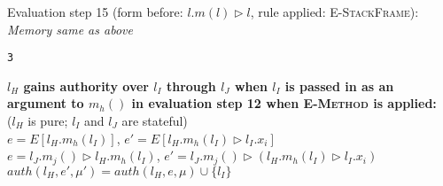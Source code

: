 \documentclass{llncs}
\begin{document}
\vspace{12pt}
\noindent Evaluation step 15 (form before: $l.m(l) \rhd l$, rule applied: \textsc{E-StackFrame}):\\
\vspace{-6pt}
\indent\textit{Memory same as above}\\
\vspace{-6pt}
\begin{lstlisting}[xleftmargin=20pt]
3
\end{lstlisting}


\newpage

\noindent\textbf{$l_H$ gains authority over $l_I$ through $l_J$ when $l_I$ is passed in as an argument to $m_h()$ in evaluation step 12 when \textsc{E-Method} is applied:}\\

\noindent ($l_H$ is pure; $l_I$ and $l_J$ are stateful)\\

\noindent$e = E[l_H.m_h(l_I)]$, $e' = E[l_H.m_h(l_I) \rhd l_I.x_i]$\\

\noindent$e = l_J.m_j() \rhd l_H.m_h(l_I)$, $e' = l_J.m_j() \rhd (l_H.m_h(l_I) \rhd l_I.x_i)$\\

\noindent$auth(l_H, e', \mu') = auth(l_H, e, \mu) \cup \{ l_I \}$
\end{document}

